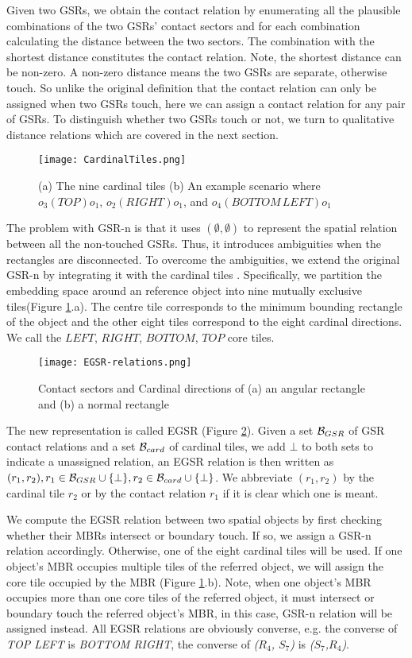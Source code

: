 \documentclass[letterpaper]{article}
\begin{document}
Given two GSRs, we obtain the contact relation by enumerating all the plausible combinations of the two GSRs' contact sectors and for each combination calculating the distance between the two sectors. The combination with the shortest distance constitutes the contact relation. Note, the shortest distance can be non-zero. A non-zero distance means the two GSRs are separate, otherwise touch. So unlike the original definition that the contact relation can only be assigned when two GSRs touch, here we can assign a contact relation for any pair of GSRs. To distinguish whether two GSRs touch or not, we turn to qualitative distance relations which are covered in the next section.
\begin{figure}[h!]
\centering\texttt{[image: CardinalTiles.png]}\caption{(a) The nine cardinal tiles (b) An example scenario where $o_3 (TOP) o_1$, $o_2 (RIGHT) o_1$, and $o_4 (BOTTOM\,LEFT) o_1$}
\label{CardinalTile}
\end{figure}
The problem with GSR-n is that it uses $(\emptyset, \emptyset)$ to represent the spatial relation between all the non-touched GSRs. Thus, it introduces ambiguities when the rectangles are disconnected. To overcome the ambiguities, we extend the original GSR-n by integrating it with the cardinal tiles \cite{goyal1997direction}. Specifically, we partition the embedding space around an reference object into nine mutually exclusive tiles(Figure \ref{CardinalTile}.a). The centre tile corresponds to the minimum bounding rectangle of the object and the other eight tiles correspond to the eight cardinal directions. We call the $LEFT$, $RIGHT$, $BOTTOM$, $TOP$ core tiles.  

\begin{figure}[h!]
\centering\texttt{[image: EGSR-relations.png]}\caption{Contact sectors and Cardinal directions of (a) an angular rectangle and (b) a normal rectangle}
\label{EGSR}
\end{figure}
The new representation is called EGSR (Figure \ref{EGSR}). Given a set ${\cal B}_{GSR}$ of GSR contact relations and a set ${\cal B}_{card}$ of cardinal tiles,  we add $\bot$ to both sets to indicate a unassigned relation, an EGSR relation is then written as $(r_1, r_2), r_1 \in {\cal B}_{GSR}\cup \{\bot\}, r_2 \in {\cal B}_{card}\cup \{\bot\}$. We abbreviate $(r_1,r_2)$ by the cardinal tile $r_2$ or by the contact relation $r_1$ if it is clear which one is meant. 

We compute the EGSR relation between two spatial objects by first checking whether their MBRs intersect or boundary touch. If so, we assign a GSR-n relation accordingly. Otherwise, one of the eight cardinal tiles will be used. If one object's MBR occupies multiple tiles of the referred object, we will assign the core tile occupied by the MBR (Figure \ref{CardinalTile}.b). Note, when one object's MBR occupies more than one core tiles of the referred object, it must intersect or boundary touch the referred object's MBR, in this case, GSR-n relation will be assigned instead. All EGSR relations are obviously converse, e.g. the converse of \emph{TOP LEFT} is \emph{BOTTOM RIGHT}, the converse of \emph{($R_4$, $S_7$)} is \emph{($S_7$,$R_4$)}.
\end{document}
